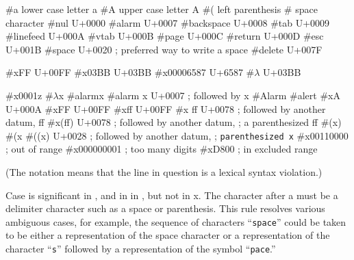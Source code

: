 \begin{schemenoindent}
\#\backwhack{}a          \ev \textrm{lower case letter a}
\#\backwhack{}A          \ev \textrm{upper case letter A}
\#\backwhack{}(          \ev \textrm{left parenthesis}
\#\backwhack{}           \ev \textrm{space character}
\#\backwhack{}nul        \ev \textrm{U+0000}
\#\backwhack{}alarm      \ev \textrm{U+0007}
\#\backwhack{}backspace  \ev \textrm{U+0008}
\#\backwhack{}tab        \ev \textrm{U+0009}
\#\backwhack{}linefeed   \ev \textrm{U+000A}
\#\backwhack{}vtab       \ev \textrm{U+000B}
\#\backwhack{}page       \ev \textrm{U+000C}
\#\backwhack{}return     \ev \textrm{U+000D}
\#\backwhack{}esc        \ev \textrm{U+001B}
\#\backwhack{}space      \ev \textrm{U+0020}
\>\>; \textrm{preferred way to write a space}
\#\backwhack{}delete     \ev \textrm{U+007F}

\#\backwhack{}xFF        \ev \textrm{U+00FF}
\#\backwhack{}x03BB      \ev \textrm{U+03BB}
\#\backwhack{}x00006587  \ev \textrm{U+6587}
\#\backwhack{}\(\lambda\) \ev \textrm{U+03BB}

\#\backwhack{}x0001z     \ev {}
\#\backwhack{}\(\lambda\)x         \ev {}
\#\backwhack{}alarmx     \ev {}
\#\backwhack{}alarm x    \ev \textrm{U+0007}
\>\>; \textrm{followed by {\cf x}}
\#\backwhack{}Alarm      \ev {}
\#\backwhack{}alert      \ev {}
\#\backwhack{}xA         \ev \textrm{U+000A}
\#\backwhack{}xFF        \ev \textrm{U+00FF}
\#\backwhack{}xff        \ev \textrm{U+00FF}
\#\backwhack{}x ff       \ev \textrm{U+0078}
\>\>; \textrm{followed by another datum, {\cf ff}}
\#\backwhack{}x(ff)      \ev \textrm{U+0078}
\>\>; \textrm{followed by another datum,}
\>\>; \textrm{a parenthesized {\cf ff}}
\#\backwhack{}(x)        \ev {}
\#\backwhack{}(x         \ev {}
\#\backwhack{}((x)       \ev \textrm{U+0028}
\>\>; \textrm{followed by another datum,}
\>\>; \texttt{parenthesized {\cf x}}
\#\backwhack{}x00110000  \ev {}
\>\>; \textrm{out of range}
\#\backwhack{}x000000001 \ev {}
\>\>; \textrm{too many digits}  
\#\backwhack{}xD800      \ev {}
\>\>; \textrm{in excluded range}
\end{schemenoindent}

(The notation  means that the line in question is
a lexical syntax violation.)

Case is significant in \sharpsign\backwhack{}, and in in
\sharpsign{}, %
but not in \sharpsign\backwhack{}x.  
The character after a 
must be a delimiter character such as a
space or parenthesis.  This rule resolves various ambiguous cases, for
example, the sequence of characters ``{\tt\sharpsign\backwhack space}''
could be taken to be either a representation of the space character or a
representation of the character ``{\tt\sharpsign\backwhack s}'' followed
by a representation of the symbol ``{\tt pace}.''


